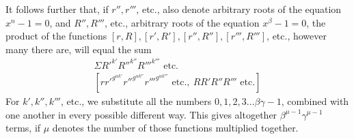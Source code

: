 It follows further that, if $r'',r'''$, etc., also denote arbitrary roots of the equation \mbox{$x^n-1=0$}, and $R'',R'''$, etc., arbitrary roots of the equation \mbox{$x^\beta-1=0$}, the product of the functions $[r,R],[r',R'],[r'',R''],[r''',R''']$, etc., however many there are, will equal the sum
\[
\begin{gathered}
\Sigma R'^{k'}R''^{k''}R'''^{k'''}\text{ etc.}\\
{}[rr'^{g^{\alpha k'}}r''^{g^{\alpha k''}}r'''^{g^{\alpha k'''}}\text{ etc.},\ RR'R''R'''\text{ etc.}]
\end{gathered}
\]
For $k',k'',k'''$, etc., we substitute all the numbers $0,1,2,3\ldots\beta\gamma-1$, combined with one another in every possible different way. This gives altogether $\beta^{\mu-1}\gamma^{\mu-1}$ terms, if $\mu$ denotes the number of those functions multiplied together.
